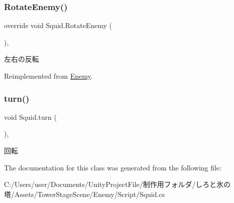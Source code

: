 \subsubsection{\texorpdfstring{Rotate\+Enemy()}{RotateEnemy()}}
{\footnotesize\ttfamily override void Squid.\+Rotate\+Enemy (\begin{DoxyParamCaption}{ }\end{DoxyParamCaption})\hspace{0.3cm}{\ttfamily [inline]}, {\ttfamily [virtual]}}



左右の反転 



Reimplemented from \hyperlink{class_enemy_a2a0e665070fd362bd3ab2f2962ebff93}{Enemy}.

\mbox{\label{class_squid_a408d6a90277478bda51b518716531627}} 
\subsubsection{\texorpdfstring{turn()}{turn()}}
{\footnotesize\ttfamily void Squid.\+turn (\begin{DoxyParamCaption}{ }\end{DoxyParamCaption})\hspace{0.3cm}{\ttfamily [inline]}, {\ttfamily [private]}}



回転 



The documentation for this class was generated from the following file\+:\begin{DoxyCompactItemize}
\item 
C\+:/\+Users/user/\+Documents/\+Unity\+Project\+File/制作用フォルダ/しろと氷の塔/\+Assets/\+Tower\+Stage\+Scene/\+Enemy/\+Script/Squid.\+cs\end{DoxyCompactItemize}
